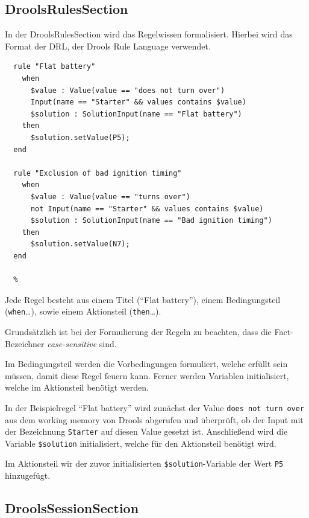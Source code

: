\documentclass[a4paper,12pt]{report}
\begin{document}
  \subsection{DroolsRulesSection}
  
  In der DroolsRulesSection wird das Regelwissen formalisiert. Hierbei wird das Format der DRL, der Drools Rule Language verwendet. 
  
  \lstset{numbers=left, numberstyle=\tiny, basicstyle=\small\ttfamily, stepnumber=1, numbersep=5pt, language=drools, breaklines=true}  
  \begin{lstlisting}[caption=Beispiel DroolsRulesSection]
  %%DroolsRules
  rule "Flat battery"
    when
      $value : Value(value == "does not turn over")
      Input(name == "Starter" && values contains $value)
      $solution : SolutionInput(name == "Flat battery")
    then
      $solution.setValue(P5);
  end
  
  rule "Exclusion of bad ignition timing"
    when
      $value : Value(value == "turns over")
      not Input(name == "Starter" && values contains $value)
      $solution : SolutionInput(name == "Bad ignition timing")
    then
      $solution.setValue(N7);
  end
  
  %
  \end{lstlisting}
  
  Jede Regel besteht aus einem Titel ("`Flat battery"'), einem Bedingungsteil (\texttt{when}…), sowie einem Aktionsteil (\texttt{then}…).
  
  Grundsätzlich ist bei der Formulierung der Regeln zu beachten, dass die Fact-Bezeichner \emph{case-sensitive} sind.
  
  Im Bedingungsteil werden die Vorbedingungen formuliert, welche erfüllt sein müssen, damit diese Regel feuern kann.
  Ferner werden Variablen initialisiert, welche im Aktionsteil benötigt werden.
  
  In der Beispielregel "`Flat battery"' wird zunächst der Value \texttt{does not turn over} aus dem working memory von Drools abgerufen und
  überprüft, ob der Input mit der Bezeichnung \texttt{Starter} auf diesen Value gesetzt ist. Anschließend wird die Variable \texttt{\$solution} 
  initialisiert, welche für den Aktionsteil benötigt wird.
  
  Im Aktionsteil wir der zuvor initialisierten \texttt{\$solution}-Variable der Wert \texttt{P5} hinzugefügt.
  
  \subsection{DroolsSessionSection}
\end{document}
